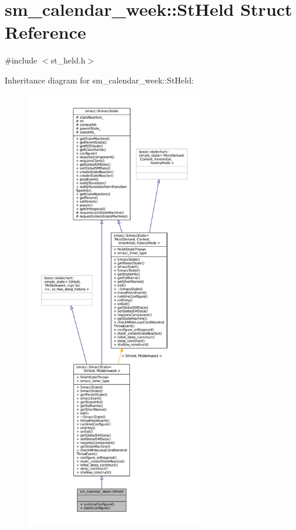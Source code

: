 \hypertarget{structsm__calendar__week_1_1StHeld}{}\section{sm\+\_\+calendar\+\_\+week\+:\+:St\+Held Struct Reference}
\label{structsm__calendar__week_1_1StHeld}


{\ttfamily \#include $<$st\+\_\+held.\+h$>$}



Inheritance diagram for sm\+\_\+calendar\+\_\+week\+:\+:St\+Held\+:
\nopagebreak
\begin{figure}[H]
\begin{center}
\leavevmode
\includegraphics[height=550pt]{structsm__calendar__week_1_1StHeld__inherit__graph}
\end{center}
\end{figure}


